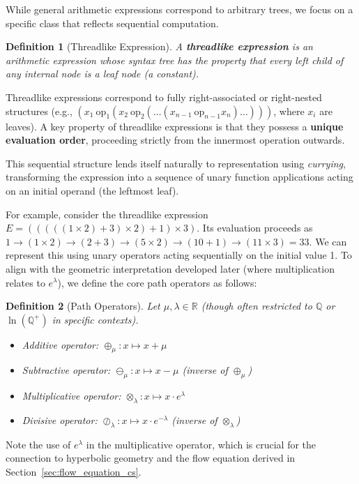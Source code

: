 \documentclass[12pt]{article}
\newtheorem{definition}{Definition}[section]
\begin{document}
While general arithmetic expressions correspond to arbitrary trees, we focus on a specific class that reflects sequential computation.

\begin{definition}[Threadlike Expression]\label{def:threadlike_expression_cs}
A \textbf{threadlike expression} is an arithmetic expression whose syntax tree has the property that every left child of any internal node is a leaf node (a constant).
\end{definition}

Threadlike expressions correspond to fully right-associated or right-nested structures (e.g., \( (x_1 \ \mathrm{op}_1 (x_2 \ \mathrm{op}_2 (\dots (x_{n-1} \ \mathrm{op}_{n-1} x_n)\dots))) \), where \(x_i\) are leaves). A key property of threadlike expressions is that they possess a \textbf{unique evaluation order}, proceeding strictly from the innermost operation outwards.

This sequential structure lends itself naturally to representation using \emph{currying}, transforming the expression into a sequence of unary function applications acting on an initial operand (the leftmost leaf).

For example, consider the threadlike expression \( E = (((((1 \times 2) + 3) \times 2) + 1) \times 3) \). Its evaluation proceeds as $1 \to (1 \times 2) \to (2+3) \to (5 \times 2) \to (10+1) \to (11 \times 3) = 33$. We can represent this using unary operators acting sequentially on the initial value 1. To align with the geometric interpretation developed later (where multiplication relates to $e^\lambda$), we define the core path operators as follows:

\begin{definition}[Path Operators]\label{def:path_operators_cs}
Let \( \mu, \lambda \in \mathbb{R} \) (though often restricted to \( \mathbb{Q} \) or \( \ln(\mathbb{Q}^+) \) in specific contexts).
\begin{itemize}
  \item Additive operator: \( \oplus_\mu : x \mapsto x + \mu \)
  \item Subtractive operator: \( \ominus_\mu : x \mapsto x - \mu \) (inverse of \( \oplus_\mu \))
  \item Multiplicative operator: \( \otimes_\lambda : x \mapsto x \cdot e^\lambda \)
  \item Divisive operator: \( \oslash_\lambda : x \mapsto x \cdot e^{-\lambda} \) (inverse of \( \otimes_\lambda \))
\end{itemize}
\end{definition}
Note the use of \( e^\lambda \) in the multiplicative operator, which is crucial for the connection to hyperbolic geometry and the flow equation derived in Section~\ref{sec:flow_equation_cs}. %
\end{document}
